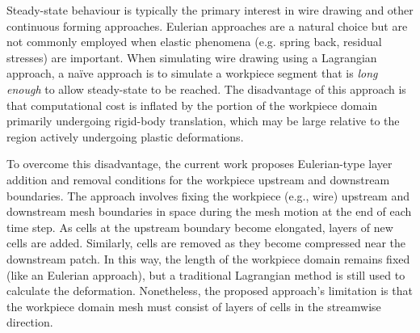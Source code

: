 \documentclass[sn-mathphys,Numbered]{sn-jnl}%
\begin{document}
Steady-state behaviour is typically the primary interest in wire drawing and other continuous forming approaches.
Eulerian approaches are a natural choice but are not commonly employed when elastic phenomena (e.g. spring back, residual stresses) are important.
When simulating wire drawing using a Lagrangian approach, a na\"ive approach is to simulate a workpiece segment that is \emph{long enough} to allow steady-state to be reached.
The disadvantage of this approach is that computational cost is inflated by the portion of the workpiece domain primarily undergoing rigid-body translation, which may be large relative to the region actively undergoing plastic deformations.

To overcome this disadvantage, the current work proposes Eulerian-type layer addition and removal conditions for the workpiece upstream and downstream boundaries.
The approach involves fixing the workpiece (e.g., wire) upstream and downstream mesh boundaries in space during the mesh motion at the end of each time step.
As cells at the upstream boundary become elongated, layers of new cells are added.
Similarly, cells are removed as they become compressed near the downstream patch.
In this way, the length of the workpiece domain remains fixed (like an Eulerian approach), but a traditional Lagrangian method is still used to calculate the deformation.
Nonetheless, the proposed approach's limitation is that the workpiece domain mesh must consist of layers of cells in the streamwise direction.
\end{document}
